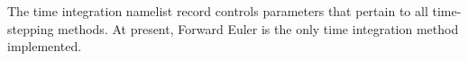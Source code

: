 The time integration namelist record controls parameters that pertain to all time-stepping methods.  At present, Forward Euler is the only time integration method implemented.
